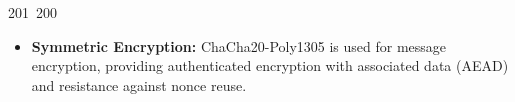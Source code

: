 201~200~\documentclass{article}
\begin{document}
\begin{itemize}
	                                                                                                                                                                                                                                                                                                	                                                                                                                                        	    	                                                                                                	                                                                                                                                                                                                                                                                                                                                	                                                                        	                                                                        	                                                                                                                                        	                                                                                                                                                                        \item \textbf{Symmetric Encryption:} ChaCha20-Poly1305 is used for message encryption, providing authenticated encryption with associated data (AEAD) and resistance against nonce reuse.
	                                                                                                                                                                                                                                                                                                	                                                                                                                                        	    	                                                                                                	                                                                                                                                                                                                                                                                                                                                	                                                                        	                                                                        	                                                                                                                                        	                                                                                                                                                                        \end{itemize}
\end{document}
